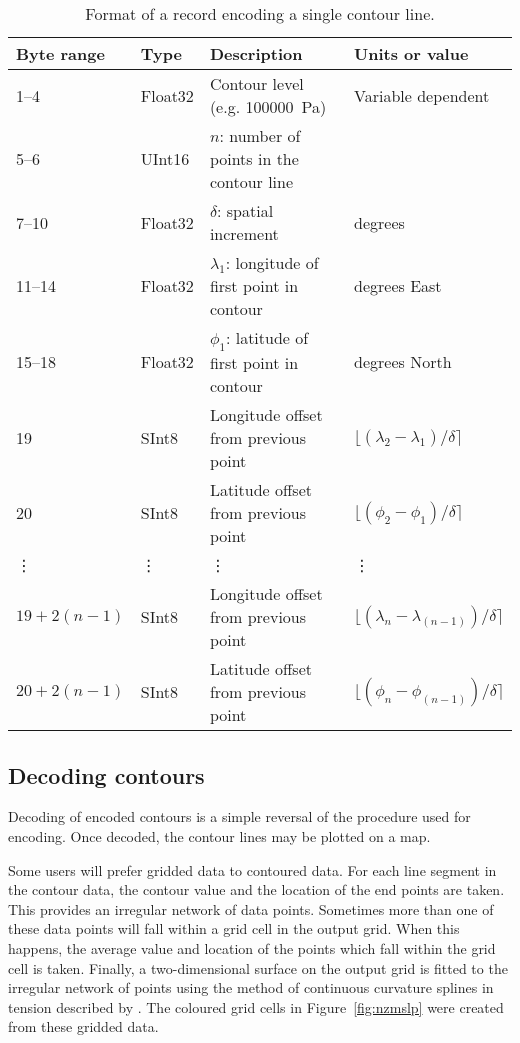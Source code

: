 \documentclass[12pt,a4paper]{article}
\begin{document}
\begin{table*}
\centering
\begin{tabular}{llll} \hline
Byte range		& Type		& Description											 		& Units or value		\\	\hline
1--4				& Float32	& Contour level (e.g. \SI{100000}{\Pa})		 		& Variable dependent	\\
5--6				& UInt16		& $n$: number of points in the contour line			&							\\
7--10				& Float32	& $\delta$: spatial increment								& degrees \\
11--14			& Float32	& $\lambda_1$: longitude of first point in contour	& degrees East\\
15--18			& Float32	& $\phi_1$: latitude of first point in contour		& degrees North \\
19					& SInt8		& Longitude offset from previous point					& $\lfloor(\lambda_2 - \lambda_1) / \delta\rceil$			\\
20					& SInt8		& Latitude offset from previous point 					& $\lfloor(\phi_2 - \phi_1) / \delta\rceil$					\\
\vdots			& \vdots		& \vdots															& \vdots 																\\
$19 + 2(n-1)$	& SInt8		& Longitude offset from previous point					& $\lfloor(\lambda_n - \lambda_{(n-1)}) / \delta\rceil$	\\
$20 + 2(n-1)$	& SInt8		& Latitude offset from previous point					& $\lfloor(\phi_n - \phi_{(n-1)}) / \delta\rceil$ 			\\ \hline
\end{tabular}
\caption{\label{tab:contour_record}Format of a record encoding a single contour line.}
\end{table*}

\subsection*{Decoding contours}
\label{sec:decoding}

Decoding of encoded contours is a simple reversal of the procedure used for
encoding. Once decoded, the contour lines may be plotted on a map.

Some users will prefer gridded data to contoured data. For each line segment in
the contour data, the contour value and the location of the end points are
taken. This provides an irregular network of data points. Sometimes more than
one of these data points will fall within a grid cell in the output grid. When
this happens, the average value and location of the points which fall within
the grid cell is taken. Finally, a two-dimensional surface on the output grid
is fitted to the irregular network of points using the method of continuous
curvature splines in tension described by \cite{smith_wessel1990}. The coloured
grid cells in Figure~\ref{fig:nzmslp} were created from these gridded data.
\end{document}
